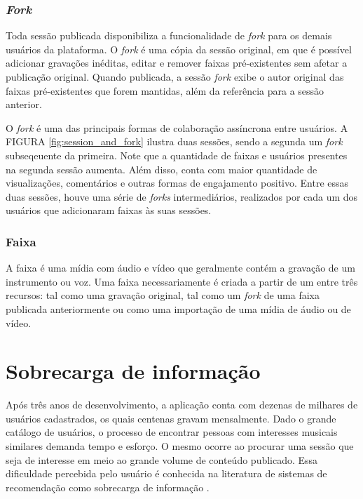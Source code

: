 \subsubsection{\textit{Fork}} Toda sessão publicada disponibiliza a
funcionalidade de \textit{fork} para os demais usuários da plataforma. O
\textit{fork} é uma cópia da sessão original, em que é possível adicionar
gravações inéditas, editar e remover faixas pré-existentes sem afetar a
publicação original. Quando publicada, a sessão \textit{fork} exibe o autor original das faixas
pré-existentes que forem mantidas, além da referência para a sessão anterior.

O \textit{fork} é uma das principais formas de colaboração assíncrona entre
usuários. A FIGURA \ref{fig:session_and_fork} ilustra duas sessões, sendo a
segunda um \textit{fork} subseqeuente da primeira. Note que a quantidade de
faixas e usuários presentes na segunda sessão aumenta. Além disso, conta com
maior quantidade de visualizações, comentários e outras formas de engajamento
positivo. Entre essas duas sessões, houve uma série de \textit{forks}
intermediários, realizados por cada um dos usuários que adicionaram faixas às
suas sessões.


\subsubsection{Faixa}
A faixa é uma mídia com áudio e vídeo que geralmente contém a gravação de um
instrumento ou voz. Uma faixa necessariamente é criada a partir de um entre três
recursos: tal como uma gravação original, tal como um \textit{fork} de uma faixa
publicada anteriormente ou como uma importação de uma mídia de áudio ou de
vídeo.




\section{Sobrecarga de informação}

Após três anos de desenvolvimento, a aplicação conta com dezenas de milhares de
usuários cadastrados, os quais centenas gravam mensalmente. Dado o grande
catálogo de usuários, o processo de encontrar pessoas com interesses musicais
similares demanda tempo e esforço. O mesmo ocorre ao procurar uma sessão que
seja de interesse em meio ao grande volume de conteúdo publicado. Essa
dificuldade percebida pelo usuário é conhecida na literatura de sistemas de
recomendação como sobrecarga de informação \cite{roetzel2019information}.

